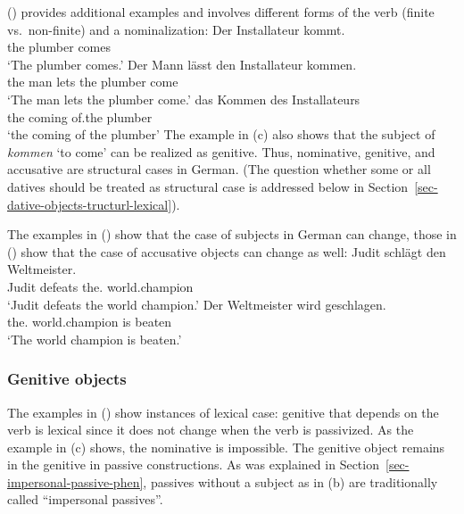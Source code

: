 () provides additional examples and involves different forms of the verb (finite
vs.\ non-finite) and a nominalization:
\eal
\ex 
\gll Der Installateur kommt.\\
     the plumber      comes\\
\glt `The plumber comes.'
\ex 
\gll Der Mann lässt den Installateur kommen.\\
     the man  lets the plumber      come\\
\glt `The man lets the plumber come.'
\ex 
\gll das Kommen des Installateurs\\
     the coming of.the plumber\\
\glt `the coming of the plumber'
\zl
The example in (c) also shows that the subject of \emph{kommen} `to come' can be realized as
genitive. Thus, nominative, genitive, and accusative are structural cases in German. (The question
whether some or all datives should be treated as structural case is addressed below in Section~\ref{sec-dative-objects-tructurl-lexical}).

The examples in () show that the case of subjects in German can change, those in ()
show that the case of accusative objects can change as well:
\eal
\ex 
\gll Judit schlägt den Weltmeister.\\
     Judit defeats the.\ACC{} world.champion\\
\glt `Judit defeats the world champion.'
\ex 
\gll Der Weltmeister wird geschlagen.\\
     the.\NOM{} world.champion is beaten\\
\glt `The world champion is beaten.'
\zl

\subsubsection{Genitive objects}

The examples in () show instances of lexical case: genitive that depends on the verb is
lexical since it does not change when the verb is passivized.
\eal
{}
\zl
As the example in (c) shows, the nominative is impossible. The genitive object remains in the
genitive in passive constructions. As was explained in Section~\ref{sec-impersonal-passive-phen},
passives without a subject as in (b) are traditionally called ``impersonal passives''.


